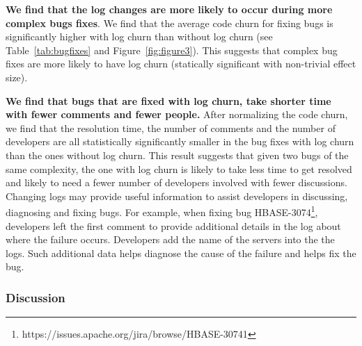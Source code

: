 \textbf{We find that the log changes are more likely to occur during more complex bugs fixes}. We find that the average code churn for fixing bugs is significantly higher with log churn than without log churn (see Table~\ref{tab:bugfixes} and Figure~\ref{fig:figure3}). This suggests that complex bug fixes are more likely to have log churn (statically significant with non-trivial effect size). 

\textbf{We find that bugs that are fixed with log churn, take shorter time with fewer comments and fewer people.} After normalizing the code churn, we find that the resolution time, the number of comments and the number of developers are all statistically significantly smaller in the bug fixes with log churn than the ones without log churn. This result suggests that given two bugs of the same complexity, the one with log churn is likely to take less time to get resolved and likely to need a fewer number of developers involved with fewer discussions. Changing logs may provide useful information to assist developers in discussing, diagnosing and fixing bugs. For example, when fixing bug HBASE-3074\footnote{https://issues.apache.org/jira/browse/HBASE-30741}, developers left the first comment to provide additional details in the log about where the failure occurs. Developers add the name of the servers into the the logs. Such additional data helps diagnose the cause of the failure and helps fix the bug.

\subsubsection*{Discussion}





